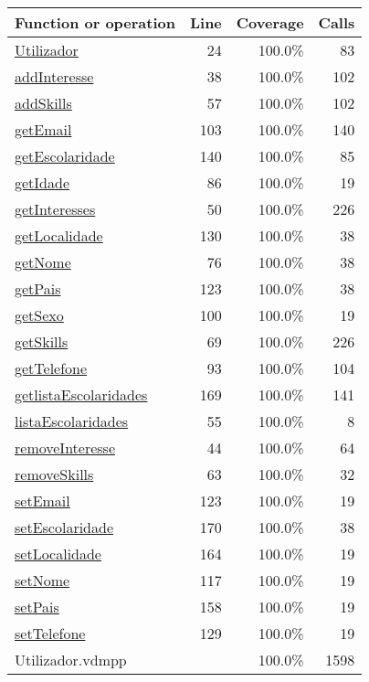 \begin{longtable}{|l|r|r|r|}
\hline
Function or operation & Line & Coverage & Calls \\
\hline
\hline
\hyperref[Utilizador:24]{Utilizador} & 24&100.0\% & 83 \\
\hline
\hyperref[addInteresse:38]{addInteresse} & 38&100.0\% & 102 \\
\hline
\hyperref[addSkills:57]{addSkills} & 57&100.0\% & 102 \\
\hline
\hyperref[getEmail:103]{getEmail} & 103&100.0\% & 140 \\
\hline
\hyperref[getEscolaridade:140]{getEscolaridade} & 140&100.0\% & 85 \\
\hline
\hyperref[getIdade:86]{getIdade} & 86&100.0\% & 19 \\
\hline
\hyperref[getInteresses:50]{getInteresses} & 50&100.0\% & 226 \\
\hline
\hyperref[getLocalidade:130]{getLocalidade} & 130&100.0\% & 38 \\
\hline
\hyperref[getNome:76]{getNome} & 76&100.0\% & 38 \\
\hline
\hyperref[getPais:123]{getPais} & 123&100.0\% & 38 \\
\hline
\hyperref[getSexo:100]{getSexo} & 100&100.0\% & 19 \\
\hline
\hyperref[getSkills:69]{getSkills} & 69&100.0\% & 226 \\
\hline
\hyperref[getTelefone:93]{getTelefone} & 93&100.0\% & 104 \\
\hline
\hyperref[getlistaEscolaridades:169]{getlistaEscolaridades} & 169&100.0\% & 141 \\
\hline
\hyperref[listaEscolaridades:55]{listaEscolaridades} & 55&100.0\% & 8 \\
\hline
\hyperref[removeInteresse:44]{removeInteresse} & 44&100.0\% & 64 \\
\hline
\hyperref[removeSkills:63]{removeSkills} & 63&100.0\% & 32 \\
\hline
\hyperref[setEmail:123]{setEmail} & 123&100.0\% & 19 \\
\hline
\hyperref[setEscolaridade:170]{setEscolaridade} & 170&100.0\% & 38 \\
\hline
\hyperref[setLocalidade:164]{setLocalidade} & 164&100.0\% & 19 \\
\hline
\hyperref[setNome:117]{setNome} & 117&100.0\% & 19 \\
\hline
\hyperref[setPais:158]{setPais} & 158&100.0\% & 19 \\
\hline
\hyperref[setTelefone:129]{setTelefone} & 129&100.0\% & 19 \\
\hline
\hline
Utilizador.vdmpp & & 100.0\% & 1598 \\
\hline
\end{longtable}

